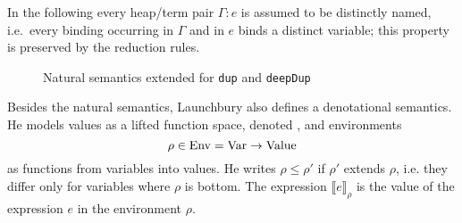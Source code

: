 \documentclass[preprint]{sigplanconf}
\theoremstyle{nonumberplain}
\newcommand{\li}{\lstinline[style=Haskell]}
\begin{document}
In the following every heap/term pair $\Gamma : e$ is assumed to be distinctly named, i.e.\ every binding occurring in $\Gamma$ and in $e$ binds a distinct variable; this property is preserved by the reduction rules.

\begin{figure*}
\parskip1cm
\caption{Natural semantics extended for \li-dup- and \li-deepDup-}
\label{fig:semrules}
\end{figure*}

\newcommand{\dsem}[2]{\llbracket #1 \rrbracket_{#2}}
\newcommand{\esem}[1]{\{\!\!\{#1\}\!\!\}}
\newcommand{\case}[1]{\par\vspace{\standardvspace}\noindent\textbf{Case:} #1\nopagebreak\par\noindent\ignorespaces}

Besides the natural semantics, Launchbury also defines a denotational semantics. He models values as a lifted function space, denoted \sValue, and environments
\[
\rho \in \text{Env} = \text{Var} \to \text{Value}
\]
as functions from variables into values. He writes $\rho \le \rho'$ if $\rho'$ extends $\rho$, i.e. they differ only for variables where $\rho$ is bottom. The expression $\dsem e \rho$ is the value of the expression $e$ in the environment $\rho$.
\end{document}
